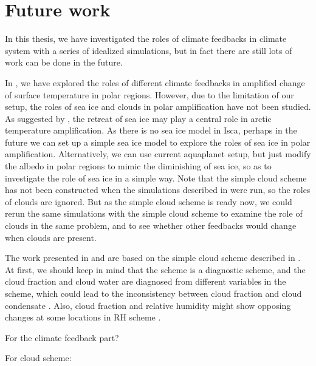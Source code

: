 \section{Future work}
In this thesis, we have investigated the 
roles of climate feedbacks in climate system with a series of idealized simulations, but in fact there are still lots of work can be done in the future.

In , we have explored the roles of different climate feedbacks in amplified change of surface temperature in polar regions. However, due to the limitation of our setup, the roles of sea ice and clouds in polar amplification have not been studied. As suggested by \cite{Screen2010}, the retreat of sea ice may play a central role in arctic temperature amplification. As there is no sea ice model in Isca, perhaps in the future we can set up a simple sea ice model to explore the roles of sea ice in polar amplification. Alternatively, we can use current aquaplanet setup, but just modify the albedo in polar regions to mimic the diminishing of sea ice, so as to investigate the role of sea ice in a simple way. Note that the simple cloud scheme has not been constructed when the simulations described in  were run, so the roles of clouds are ignored. But as the simple cloud scheme is ready now, we could rerun the same simulations with the simple cloud scheme to examine the role of clouds in the same problem, and to see whether other feedbacks would change when clouds are present.


The work presented in  and  are based on the simple cloud scheme described in \cite{Liu2021simcloud}. At first, we should keep in mind that the scheme is a diagnostic scheme, and the cloud fraction and cloud water are diagnosed from different variables in the scheme, which could lead to the inconsistency between cloud fraction and cloud condensate \citep[e.g.,][]{Gregory2002,Tompkins2005}. Also, cloud fraction and relative humidity might show opposing changes at some locations in RH scheme \citep{Ming2018}.


For the climate feedback part?

For cloud scheme:

